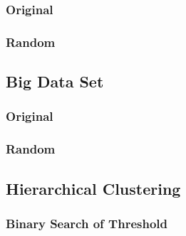 \documentclass[a4paper,10pt]{article}
\begin{document}
\subsubsection{Original}

\subsubsection{Random}

\subsection{Big Data Set}

\subsubsection{Original}

\subsubsection{Random}

\subsection{Hierarchical Clustering}

\subsubsection{Binary Search of Threshold}

\newpage
\end{document}
